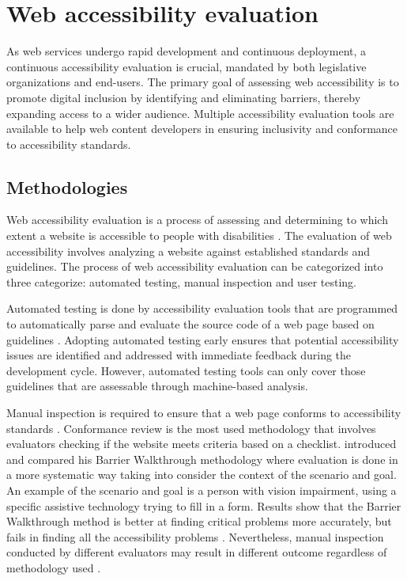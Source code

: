 \chapter{Web accessibility evaluation\label{accessibility_evaluation}}

As web services undergo rapid development and continuous deployment, a continuous accessibility evaluation is crucial, mandated by both legislative organizations and end-users. The primary goal of assessing web accessibility is to promote digital inclusion by identifying and eliminating barriers, thereby expanding access to a wider audience. Multiple accessibility evaluation tools are available to help web content developers in ensuring inclusivity and conformance to accessibility standards.

\section{Methodologies}

Web accessibility evaluation is a process of assessing and determining to which extent a website is accessible to people with disabilities \citep[Chapter~26.2]{webaccessibility}. The evaluation of web accessibility involves analyzing a website against established standards and guidelines. The process of web accessibility evaluation can be categorized into three categorize: automated testing, manual inspection and user testing.

Automated testing is done by accessibility evaluation tools that are programmed to automatically parse and evaluate the source code of a web page based on guidelines \citep[Chapter~26.2]{webaccessibility}. Adopting automated testing early ensures that potential accessibility issues are identified and addressed with immediate feedback during the development cycle. However, automated testing tools can only cover those guidelines that are assessable through machine-based analysis.

Manual inspection is required to ensure that a web page conforms to accessibility standards \citep[Chapter~26.2]{webaccessibility}. Conformance review is the most used methodology that involves evaluators checking if the website meets criteria based on a checklist. \textcite{comparative_accessibility_methods} introduced and compared his Barrier Walkthrough methodology where evaluation is done in a more systematic way taking into consider the context of the scenario and goal. An example of the scenario and goal is a person with vision impairment, using a specific assistive technology trying to fill in a form. Results show that the Barrier Walkthrough method is better at finding critical problems more accurately, but fails in finding all the accessibility problems \citep{comparative_accessibility_methods}. Nevertheless, manual inspection conducted by different evaluators may result in different outcome regardless of methodology used \citep{accessibility_evaluation_experts, 10.1145/1878803.1878813_testability_expertise}. 

